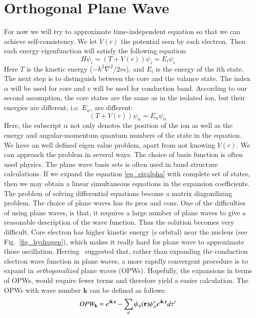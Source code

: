 \chapter{Orthogonal Plane Wave}\label{appen_opw}

For now we will try to approximate time-independent \schrod equation so that we can achieve self-consistency. We let $V(r)$ the potential seen by each electron. Then each energy eigenfunction will satisfy the following equation:
\begin{equation}
\label{eigeqn}
H\psi_i = (T+V(r))\psi_i = E_i\psi_i 
\end{equation}
Here $T$ is the kinetic energy ($-\hbar^2\nabla^2/2m$), and $E_i$ is the energy of the ith state. The next step is to distinguish between the core and the valance state. The index $\alpha$ will be used for core and $v$ will be used for conduction band. According to our second assumption, the core states are the same as in the isolated ion, but their energies are different, i.e. $E_\alpha$, are different:
\begin{equation}
\label{eq_eigalpha}
(T+V(r))\psi_\alpha = E_\alpha \psi_\alpha
\end{equation}
Here, the subscript $\alpha$ not only denotes the position of the ion as well as the energy and angular-momentum quantum numbers of the state in the equation. We have an well defined eigen value problem, apart from not knowing $V(r)$. We can approach the problem in several ways. The choice of basis function is often used physics. The plane wave basis sets is often used in band structure calculations. If we expand the \schrod equation \ref{eq_eigalpha} with complete set of states,  then we may obtain a linear simultaneous equations in the expansion coefficients. The problem of  solving differential equations become a matrix diagonilizing problem. The choice of plane waves has its pros and cons. One of the difficulties of using plane waves, is that, it requires a large number of plane waves to give a reasonable description of the wave function. Thus the solution becomes very difficult. Core electron has higher kinetic energy (s orbital) near the nucleus (see Fig.~\ref{fig_hydrogen}), which makes it really hard for plane wave to approximate those oscillation. Herring~\cite{herring1940new} suggested that, rather than expanding the conduction electron wave function in plane waves, a more rapidly convergent procedure is to expand in \textit{orthogonalized} plane waves (OPWs). Hopefully, the expansions in terms of OPWs, would require fewer terms and therefore yield a easier calculation. The OPWs with wave number $\mathbf{k}$ can be defined as follows:
\begin{equation}
\label{eq_opw}
OPW_{\vb{k}} = e^{i\vb{k.r}} - \sum_{\alpha} \psi_{\alpha}(\vb{r}) \psi^{\ast}_{\alpha} e^{i{\vb{k.r}}} d\tau'
\end{equation}

